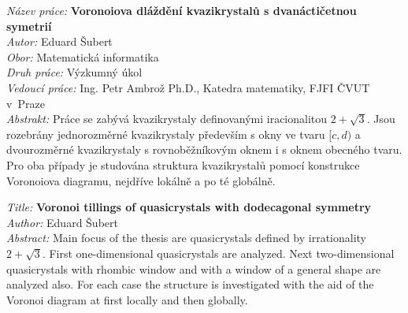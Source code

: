 \documentclass[a4paper,10pt,twoside]{article}
\theoremstyle{definition}
\theoremstyle{remark}
\begin{document}

\cleardoublepage

{
\setlength{\parindent}{0pt}

\textit{Název práce:}
\textbf{Voronoiova dláždění kvazikrystalů s dvanáctičetnou symetrií} \\

\textit{Autor:} Eduard Šubert \\

\textit{Obor:} Matematická informatika \\

\textit{Druh práce:} Výzkumný úkol \\

\textit{Vedoucí práce:}  Ing. Petr Ambrož Ph.D., Katedra matematiky, FJFI ČVUT v~Praze \\

\textit{Abstrakt:} 
Práce se zabývá kvazikrystaly definovanými iracionalitou $2+\sqrt{3}$. Jsou rozebrány jednorozměrné kvazikrystaly především s okny ve tvaru $[c,d)$ a dvourozměrné kvazikrystaly s rovnoběžníkovým oknem i s oknem obecného tvaru. Pro oba případy je studována struktura kvazikrystalů pomocí konstrukce Voronoiova diagramu, nejdříve lokálně a po té globálně. \\

\vspace{1.5cm}

\textit{Title:}
\textbf{Voronoi tillings of quasicrystals with dodecagonal symmetry} \\

\textit{Author:} Eduard Šubert\\

\textit{Abstract:} 
Main focus of the thesis are quasicrystals defined by irrationality $2+\sqrt{3}$. First one-dimensional quasicrystals are analyzed. Next two-dimensional quasicrystals with rhombic window and with a window of a general shape are analyzed also. For each case the structure is investigated with the aid of the Voronoi diagram at first locally and then globally. \\

}


\cleardoublepage

\tableofcontents
\setcounter{page}{1}
\cleardoublepage
\end{document}
